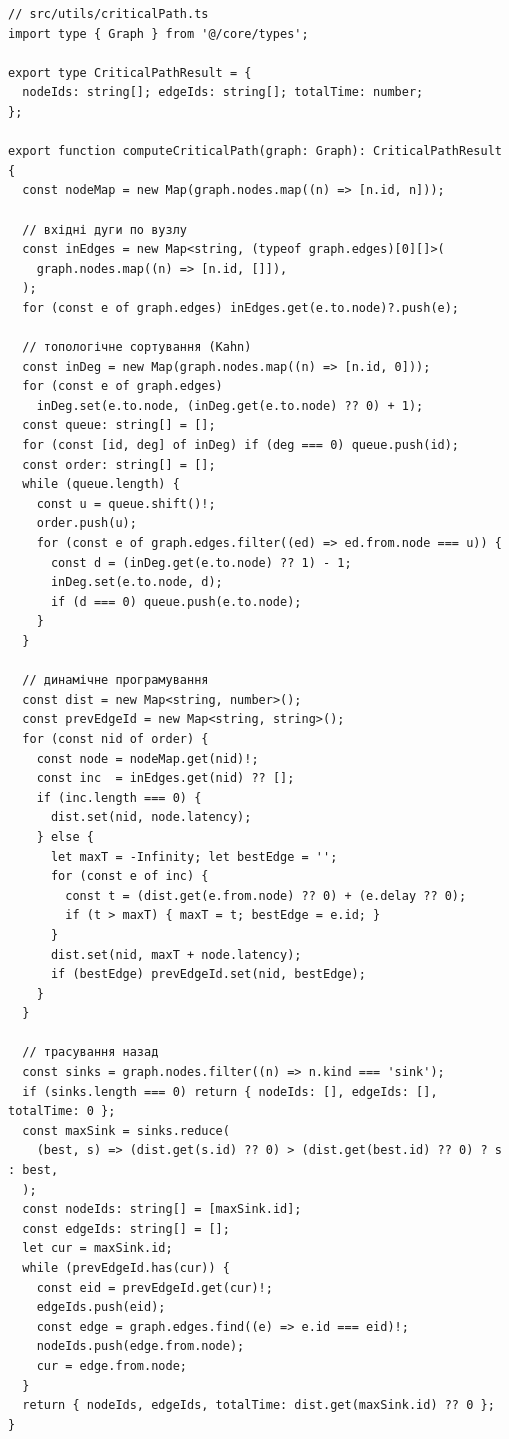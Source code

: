 \documentclass[
]{article}
\begin{document}
\begin{verbatim}
// src/utils/criticalPath.ts
import type { Graph } from '@/core/types';

export type CriticalPathResult = {
  nodeIds: string[]; edgeIds: string[]; totalTime: number;
};

export function computeCriticalPath(graph: Graph): CriticalPathResult {
  const nodeMap = new Map(graph.nodes.map((n) => [n.id, n]));

  // вхідні дуги по вузлу
  const inEdges = new Map<string, (typeof graph.edges)[0][]>(
    graph.nodes.map((n) => [n.id, []]),
  );
  for (const e of graph.edges) inEdges.get(e.to.node)?.push(e);

  // топологічне сортування (Kahn)
  const inDeg = new Map(graph.nodes.map((n) => [n.id, 0]));
  for (const e of graph.edges)
    inDeg.set(e.to.node, (inDeg.get(e.to.node) ?? 0) + 1);
  const queue: string[] = [];
  for (const [id, deg] of inDeg) if (deg === 0) queue.push(id);
  const order: string[] = [];
  while (queue.length) {
    const u = queue.shift()!;
    order.push(u);
    for (const e of graph.edges.filter((ed) => ed.from.node === u)) {
      const d = (inDeg.get(e.to.node) ?? 1) - 1;
      inDeg.set(e.to.node, d);
      if (d === 0) queue.push(e.to.node);
    }
  }

  // динамічне програмування
  const dist = new Map<string, number>();
  const prevEdgeId = new Map<string, string>();
  for (const nid of order) {
    const node = nodeMap.get(nid)!;
    const inc  = inEdges.get(nid) ?? [];
    if (inc.length === 0) {
      dist.set(nid, node.latency);
    } else {
      let maxT = -Infinity; let bestEdge = '';
      for (const e of inc) {
        const t = (dist.get(e.from.node) ?? 0) + (e.delay ?? 0);
        if (t > maxT) { maxT = t; bestEdge = e.id; }
      }
      dist.set(nid, maxT + node.latency);
      if (bestEdge) prevEdgeId.set(nid, bestEdge);
    }
  }

  // трасування назад
  const sinks = graph.nodes.filter((n) => n.kind === 'sink');
  if (sinks.length === 0) return { nodeIds: [], edgeIds: [], totalTime: 0 };
  const maxSink = sinks.reduce(
    (best, s) => (dist.get(s.id) ?? 0) > (dist.get(best.id) ?? 0) ? s : best,
  );
  const nodeIds: string[] = [maxSink.id];
  const edgeIds: string[] = [];
  let cur = maxSink.id;
  while (prevEdgeId.has(cur)) {
    const eid = prevEdgeId.get(cur)!;
    edgeIds.push(eid);
    const edge = graph.edges.find((e) => e.id === eid)!;
    nodeIds.push(edge.from.node);
    cur = edge.from.node;
  }
  return { nodeIds, edgeIds, totalTime: dist.get(maxSink.id) ?? 0 };
}
\end{verbatim}
\end{document}
